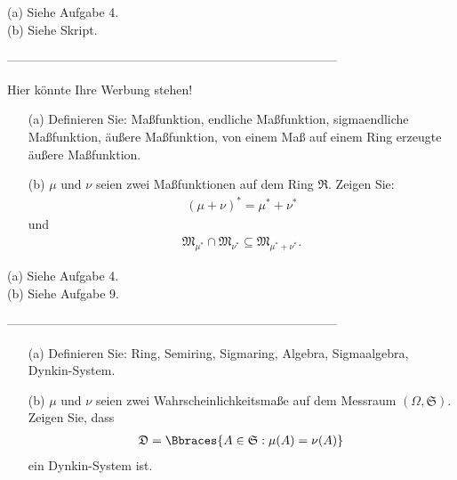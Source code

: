 \begin{solution}

(a) Siehe Aufgabe 4. \\

(b) Siehe Skript.

\end{solution}

--------------------------------------------------------------------------------

\begin{exercise}

Hier könnte Ihre Werbung stehen!

\begin{itemize}
  \item[(a)] Definieren Sie: Maßfunktion, endliche Maßfunktion, sigmaendliche Maßfunktion, äußere Maßfunktion, von einem Maß auf einem Ring erzeugte äußere Maßfunktion.
  \item[(b)] $\mu$ und $\nu$ seien zwei Maßfunktionen auf dem Ring $\mathfrak{R}$. Zeigen Sie:
  \begin{align*}
    (\mu + \nu)^\ast = \mu^\ast + \nu^\ast
  \end{align*}
  und
  \begin{align*}
    \mathfrak{M}_{\mu^\ast} \cap \mathfrak{M}_{\nu^\ast}
    \subseteq
    \mathfrak{M}_{\mu^\ast + \nu^\ast}.
  \end{align*}
\end{itemize}

\end{exercise}

\begin{solution}

(a) Siehe Aufgabe 4. \\

(b) Siehe Aufgabe 9.

\end{solution}

--------------------------------------------------------------------------------

\begin{exercise}

\begin{itemize}
  \item[(a)] Definieren Sie: Ring, Semiring, Sigmaring, Algebra, Sigmaalgebra, Dynkin-System.
  \item[(b)] $\mu$ und $\nu$ seien zwei Wahrscheinlichkeitsmaße auf dem Messraum $(\Omega, \mathfrak{S})$. Zeigen Sie, dass
  \begin{align*}
    \mathfrak{D} = \Bbraces{A \in \mathfrak{S} : \mu(A) = \nu(A)}
  \end{align*}
  ein Dynkin-System ist.
\end{itemize}

\end{exercise}

